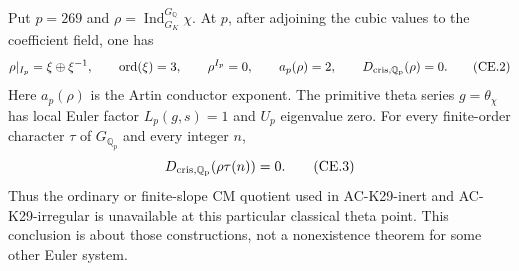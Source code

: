 \begin{proposition}
\label{AC-K29-269}
Put $p=269$ and
$\rho=\operatorname{Ind}_{G_K}^{G_{\mathbb Q}}\chi$.
At $p$, after adjoining the cubic values to the coefficient
field, one has
\[
 \rho|_{I_p}=\xi\oplus\xi^{-1},\qquad
 \operatorname{ord}(\xi)=3,\qquad
 \rho^{I_p}=0,\qquad a_p(\rho)=2,
 \qquad D_{\rm cris,\mathbb Q_p}(\rho)=0.               \tag{CE.2}
\]
Here $a_p(\rho)$ is the Artin conductor exponent.
The primitive theta series $g=\theta_\chi$ has local
Euler factor $L_p(g,s)=1$ and $U_p$ eigenvalue zero.
For every finite-order character $\tau$ of
$G_{\mathbb Q_p}$ and every integer $n$,
\[
        D_{\rm cris,\mathbb Q_p}(\rho\tau(n))=0.        \tag{CE.3}
\]
Thus the ordinary or finite-slope CM quotient used in
AC-K29-inert and AC-K29-irregular is unavailable at this
particular classical theta point.  This conclusion is
about those constructions, not a nonexistence theorem
for some other Euler system.
\end{proposition}
